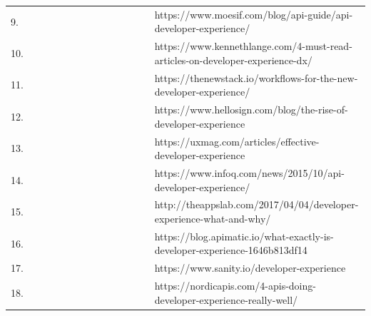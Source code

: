 \documentclass[english, 12pt, a4paper, sci, utf8, a-1b, online]{aaltothesis}
\begin{document}
\begin{center}
\begin{longtable}{p{0.05\linewidth}p{0.35\linewidth}p{0.60\linewidth}}
    9.  & \textcite{api-developer-experience-dx-resources}                & https://www.moesif.com/blog/api-guide/api-developer-experience/                                                          \\
    10. & \textcite{4-must-read-articles-on-developer-experience}         & https://www.kennethlange.com/4-must-read-articles-on-developer-experience-dx/                                            \\
    11. & \textcite{workflows-for-the-new-developer-experience}           & https://thenewstack.io/workflows-for-the-new-developer-experience/                                                       \\
    12. & \textcite{apis-for-humans-the-rise-of-developer-experience}     & https://www.hellosign.com/blog/the-rise-of-developer-experience                                                          \\
    13. & \textcite{effective-developer-experience}                       & https://uxmag.com/articles/effective-developer-experience                                                                \\
    14. & \textcite{what-is-api-developer-experience-and-why-it-matters}  & https://www.infoq.com/news/2015/10/api-developer-experience/                                                             \\
    15. & \textcite{developer-experience-what-and-why}                    & http://theappslab.com/2017/04/04/developer-experience-what-and-why/                                                      \\
    16. & \textcite{what-exactly-is-developer-experience}                 & https://blog.apimatic.io/what-exactly-is-developer-experience-1646b813df14                                               \\
    17. & \textcite{developer-experience-sanity}                          & https://www.sanity.io/developer-experience                                                                               \\
    18. & \textcite{4-apis-doing-developer-experience-really-well}        & https://nordicapis.com/4-apis-doing-developer-experience-really-well/
  \end{longtable}
\end{center}
\end{document}
